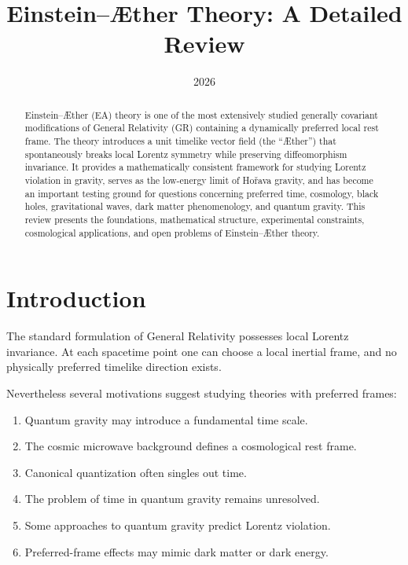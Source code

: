 \documentclass[11pt,a4paper]{article}
\title{Einstein--\AE ther Theory: A Detailed Review}
\author{}
\date{2026}
\begin{document}
\maketitle

\begin{abstract}
Einstein--\AE ther (EA) theory is one of the most extensively studied
generally covariant modifications of General Relativity (GR) containing
a dynamically preferred local rest frame.
The theory introduces a unit timelike vector field
(the ``\AE ther'') that spontaneously breaks local Lorentz symmetry
while preserving diffeomorphism invariance.
It provides a mathematically consistent framework for studying
Lorentz violation in gravity, serves as the low-energy limit of
Ho\v rava gravity, and has become an important testing ground for
questions concerning preferred time, cosmology, black holes,
gravitational waves, dark matter phenomenology, and quantum gravity.
This review presents the foundations, mathematical structure,
experimental constraints, cosmological applications, and open problems
of Einstein--\AE ther theory.
\end{abstract}

\tableofcontents

\section{Introduction}

The standard formulation of General Relativity possesses
local Lorentz invariance.
At each spacetime point one can choose a local inertial frame,
and no physically preferred timelike direction exists.

Nevertheless several motivations suggest studying theories with
preferred frames:

\begin{enumerate}
\item Quantum gravity may introduce a fundamental time scale.
\item The cosmic microwave background defines a cosmological rest frame.
\item Canonical quantization often singles out time.
\item The problem of time in quantum gravity remains unresolved.
\item Some approaches to quantum gravity predict Lorentz violation.
\item Preferred-frame effects may mimic dark matter or dark energy.
\end{enumerate}
\end{document}
